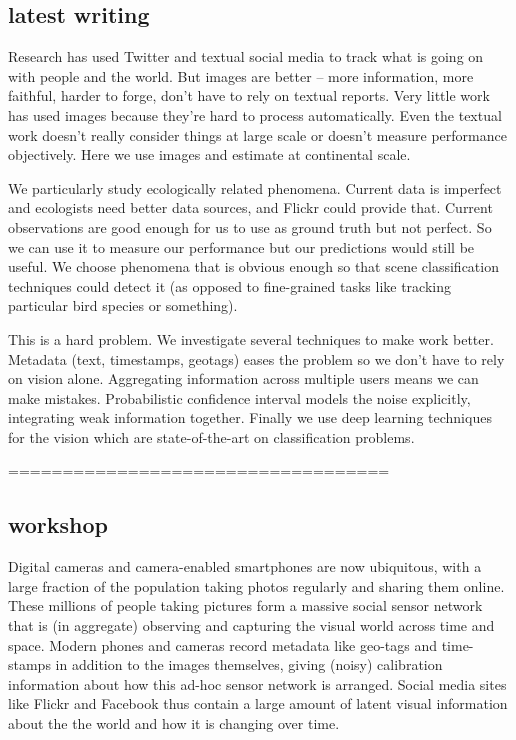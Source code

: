 \documentclass[10pt,journal,compsoc]{IEEEtran}
\begin{document}
\hfill \break
\hfill \break
\subsection*{latest writing}
\hfill \break
\hfill \break

Research has used Twitter and textual social media to track what is going on with people and the world. But images are better -- more information, more faithful, harder to forge, don't have to rely on textual reports. Very little work has used images because they're hard to process automatically. Even the textual work doesn't really consider things at large scale or doesn't measure performance objectively. Here we use images and estimate at continental scale.

We particularly study ecologically related phenomena. Current data is imperfect and ecologists need better data sources, and Flickr could provide that. Current observations are good enough for us to use as ground truth but not perfect. So we can use it to measure our performance but our predictions would still be useful. We choose phenomena that is obvious enough so that scene classification techniques could detect it (as opposed to fine-grained tasks like tracking particular bird species or something).

This is a hard problem. We investigate several techniques to make work better. Metadata (text, timestamps, geotags) eases the problem so we don't have to rely on vision alone. Aggregating information across multiple users means we can make mistakes. Probabilistic confidence interval models the noise explicitly, integrating weak information together. Finally we use deep learning techniques for the vision which are state-of-the-art on classification problems.

\hfill \break
\hfill \break
===================================
\hfill \break
\hfill \break
\subsection*{workshop}

Digital cameras and camera-enabled smartphones are now ubiquitous,
with a large fraction of the population taking photos regularly and
sharing them online. These millions of people taking pictures form a
massive social sensor network that is (in aggregate)
observing and capturing the visual world across time and space.
Modern phones and cameras record metadata like geo-tags and
time-stamps in addition to the images themselves, giving (noisy)
calibration information about how this ad-hoc sensor network is arranged.
%
Social media sites like Flickr and Facebook
thus contain a large amount of latent visual information about
the the world and how it is changing over time. 
\end{document}
